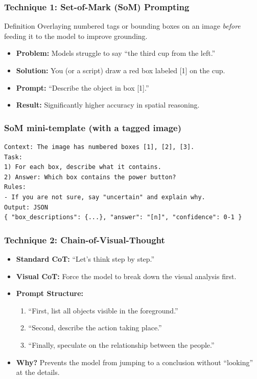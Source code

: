 \documentclass{beamer}
\begin{document}
\begin{frame}
    \frametitle{Technique 1: Set-of-Mark (SoM) Prompting}
    \begin{block}{Definition}
        Overlaying numbered tags or bounding boxes on an image \textit{before} feeding it to the model to improve grounding.
    \end{block}
    \begin{itemize}
        \item \textbf{Problem:} Models struggle to say ``the third cup from the left.''
        \item \textbf{Solution:} You (or a script) draw a red box labeled [1] on the cup.
        \item \textbf{Prompt:} ``Describe the object in box [1].''
        \item \textbf{Result:} Significantly higher accuracy in spatial reasoning.
    \end{itemize}
\end{frame}

\begin{frame}[fragile]
    \frametitle{SoM mini-template (with a tagged image)}
\begin{verbatim}
Context: The image has numbered boxes [1], [2], [3].
Task:
1) For each box, describe what it contains.
2) Answer: Which box contains the power button?
Rules:
- If you are not sure, say "uncertain" and explain why.
Output: JSON
{ "box_descriptions": {...}, "answer": "[n]", "confidence": 0-1 }
\end{verbatim}
\end{frame}

\begin{frame}
    \frametitle{Technique 2: Chain-of-Visual-Thought}
    \begin{itemize}
        \item \textbf{Standard CoT:} ``Let's think step by step.''
        \item \textbf{Visual CoT:} Force the model to break down the visual analysis first.
        \item \textbf{Prompt Structure:}
        \begin{enumerate}
            \item ``First, list all objects visible in the foreground.''
            \item ``Second, describe the action taking place.''
            \item ``Finally, speculate on the relationship between the people.''
        \end{enumerate}
        \item \textbf{Why?} Prevents the model from jumping to a conclusion without ``looking'' at the details.
    \end{itemize}
\end{frame}
\end{document}
